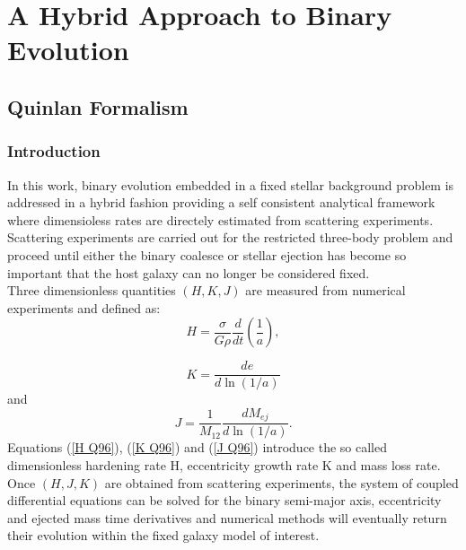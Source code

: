 \chapter{A Hybrid Approach to Binary Evolution}



\section{Quinlan Formalism}
\subsection{Introduction}
In this work, binary evolution embedded in a fixed stellar background problem is addressed in a hybrid fashion providing a self consistent analytical framework where dimensioless rates are directely estimated from scattering experiments.\\Scattering experiments are carried out for the restricted three-body problem and proceed until either the binary coalesce or stellar ejection has become so important that the host galaxy can no longer be considered fixed.\\Three dimensionless quantities $(H,K,J)$ are measured from numerical experiments and defined as:
\begin{equation}\label{H Q96}
    H=\frac{\sigma}{G\rho}\frac{d}{dt}\left(\frac{1}{a}\right),
\end{equation}

\begin{equation}\label{K Q96}
    K=\frac{de}{d\ln({1/a})}
\end{equation}
and 
\begin{equation}\label{J Q96}
    J=\frac{1}{M_{12}}\frac{dM_{ej}}{d\ln({1/a})}.
\end{equation}
Equations (\ref{H Q96}), (\ref{K Q96}) and (\ref{J Q96}) introduce the so called dimensionless hardening
rate H, eccentricity growth rate K and mass loss rate. Once $(H,J,K)$ are obtained from scattering experiments, the system of coupled differential equations can be solved for the binary semi-major axis, eccentricity and ejected mass time derivatives and numerical methods will eventually return their evolution within the fixed galaxy model of interest.



